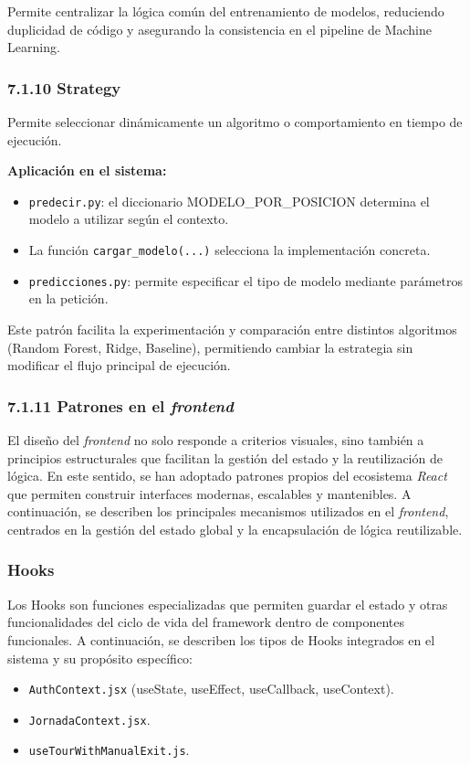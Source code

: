 Permite centralizar la lógica común del entrenamiento de modelos, reduciendo
duplicidad de código y asegurando la consistencia en el pipeline de Machine
Learning.
 
\subsubsection{7.1.10 Strategy}
 
Permite seleccionar dinámicamente un algoritmo o comportamiento en tiempo de
ejecución.
 
\textbf{Aplicación en el sistema:}
\begin{itemize}
\item \texttt{predecir.py}: el diccionario MODELO\_POR\_POSICION determina el
modelo a utilizar según el contexto.
\item La función \texttt{cargar\_modelo(...)} selecciona la implementación
concreta.
\item \texttt{predicciones.py}: permite especificar el tipo de modelo mediante
parámetros en la petición.
\end{itemize}
 
Este patrón facilita la experimentación y comparación entre distintos algoritmos
(Random Forest, Ridge, Baseline), permitiendo cambiar la estrategia sin
modificar el flujo principal de ejecución.
 
\subsubsection{7.1.11 Patrones en el \textit{frontend}}
El diseño del \textit{frontend} no solo responde a criterios visuales, sino también a
principios estructurales que facilitan la gestión del estado y la reutilización
de lógica. En este sentido, se han adoptado patrones propios del ecosistema
\textit{React} que permiten construir interfaces modernas, escalables y mantenibles.
A continuación, se describen los principales mecanismos utilizados en el
\textit{frontend}, centrados en la gestión del estado global y la encapsulación de lógica
reutilizable.
 
\subsubsection{Hooks}
 
Los Hooks son funciones especializadas que permiten guardar el estado y otras funcionalidades
del ciclo de vida del framework dentro de componentes funcionales. A continuación, se describen
los tipos de Hooks integrados en el sistema y su propósito específico:
\begin{itemize}
\item \texttt{AuthContext.jsx} (useState, useEffect, useCallback, useContext).
\item \texttt{JornadaContext.jsx}.
\item \texttt{useTourWithManualExit.js}.
\end{itemize}
 
